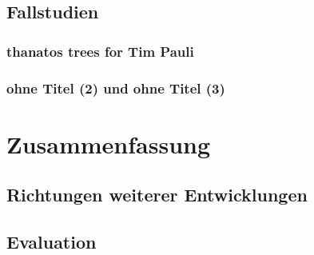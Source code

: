 \documentclass[12pt,a4paper,ngerman]{article}
\begin{document}

\subsection{Fallstudien}

\subsubsection{thanatos trees for Tim Pauli}

\subsubsection{ohne Titel (2) und ohne Titel (3)}

\section{Zusammenfassung}

\subsection{Richtungen weiterer Entwicklungen}

\subsection{Evaluation}

\newpage

\appendix

\printbibliography

\newpage

\listoffigures

\newpage
\end{document}
